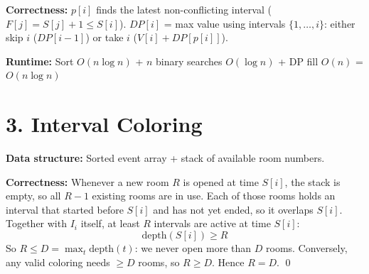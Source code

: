 \documentclass[11pt]{article}
\begin{document}
\begin{algorithm}[H]
\DontPrintSemicolon
{}
\end{algorithm}

\textbf{Correctness:} $p[i]$ finds the latest non-conflicting interval ($F[j] = S[j]+1 \le S[i]$).
$DP[i]$ = max value using intervals $\{1, \ldots, i\}$: either skip $i$ ($DP[i{-}1]$) or take $i$ ($V[i] + DP[p[i]]$).

\textbf{Runtime:} Sort $O(n \log n)$ + $n$ binary searches $O(\log n)$ + DP fill $O(n)$ = $\boxed{O(n \log n)}$

\newpage
\section*{3. Interval Coloring}

\textbf{Data structure:} Sorted event array + stack of available room numbers.

\begin{algorithm}[H]
\DontPrintSemicolon
{}
\end{algorithm}

\textbf{Correctness:}
Whenever a new room $R$ is opened at time $S[i]$, the stack is empty, so all $R-1$ existing rooms are in use. Each of those rooms holds an interval that started before $S[i]$ and has not yet ended, so it overlaps $S[i]$. Together with $I_i$ itself, at least $R$ intervals are active at time $S[i]$:
\[
\text{depth}(S[i]) \ge R
\]
So $R \le D = \max_t \text{depth}(t)$: we never open more than $D$ rooms. Conversely, any valid coloring needs $\ge D$ rooms, so $R \ge D$. Hence $R = D$. \qed
\end{document}
